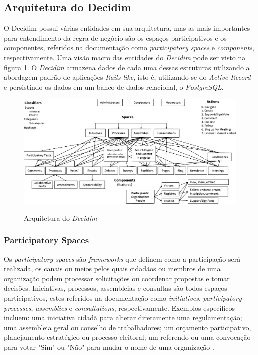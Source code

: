 \subsection{Arquitetura do Decidim}

O Decidim possui várias entidades em sua arquitetura, mas as mais importantes para entendimento da regra de negócio são os espaços participativos e os componentes, referidos na documentação como \textit{participatory spaces} e \textit{components}, respectivamente. Uma visão macro das entidades do \textit{Decidim} pode ser visto na figura \ref{fig:arquitetura-decidim}. O \textit{Decidim} armazena dados de cada uma dessas estruturas utilizando a abordagem padrão de aplicações \textit{Rails like}, isto é, utilizando-se do \textit{Active Record} e persistindo os dados em um banco de dados relacional, o \textit{PostgreSQL}.

\begin{figure}[htbp]
  \centering
  \caption{Arquitetura do \textit{Decidim}}
  \includegraphics[width=\textwidth]{figuras/diagrama_decidim-min.eps}
  \label{fig:arquitetura-decidim}
\end{figure}

\subsubsection{Participatory Spaces}

Os \textit{participatory spaces} são \textit{frameworks} que definem como a participação será realizada, os canais ou meios pelos quais cidadãos ou membros de uma organização podem processar solicitações ou coordenar propostas e tomar decisões. Iniciativas, processos, assembleias e consultas são todos espaços participativos, estes referidos na documentação como \textit{initiatives}, \textit{participatory processes}, \textit{assemblies} e \textit{consultations}, respectivamente. Exemplos específicos incluem: uma iniciativa cidadã para alterar diretamente uma regulamentação; uma assembleia geral ou conselho de trabalhadores; um orçamento participativo, planejamento estratégico ou processo eleitoral; um referendo ou uma convocação para votar "Sim" ou "Não" para mudar o nome de uma organização \cite{decidim-descriptionpage}.

